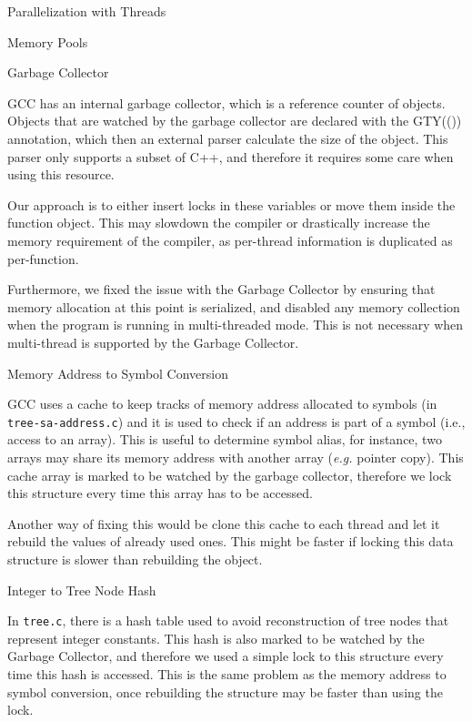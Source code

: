 \begin{section}{Parallelization with Threads}
\begin{subsection}{Memory Pools}
\end{subsection}

\begin{subsection}{Garbage Collector}

GCC has an internal garbage collector, which is a reference counter of objects.
Objects that are watched by the garbage collector are declared with the GTY(())
annotation, which then an external parser calculate the size of the object.
This parser only supports a subset of C++, and therefore it requires some care
when using this resource.

Our approach is to either insert locks in
these variables or move them inside the function object. This may slowdown 
the compiler or drastically increase the memory requirement of the compiler,
as per-thread information is duplicated as per-function.

Furthermore, we fixed the issue with the Garbage Collector by ensuring that
memory allocation at this point is serialized, and disabled any memory
collection when the program is running in multi-threaded mode. This is not
necessary when multi-thread is supported by the Garbage Collector.

\end{subsection}

\begin{subsection}{Memory Address to Symbol Conversion}

GCC uses a cache to keep tracks of memory address allocated to symbols (in
\texttt{tree-sa-address.c}) and it is used to check if an address is part of a symbol
(i.e., access to an array). This is useful to determine symbol alias, for instance,
two arrays may share its memory address with another array (\textit{e.g.} pointer
copy).
This cache array is marked to be watched by the
garbage collector, therefore we lock this structure every time this array has
to be accessed. 

Another way of fixing this would be clone this cache to each thread and
let it rebuild the values of already used ones. This might be faster if
locking this data structure is slower than rebuilding the object.

\end{subsection}

\begin{subsection}{Integer to Tree Node Hash}

In \texttt{tree.c}, there is a hash table used to avoid reconstruction of tree nodes
that represent integer constants. This hash is also marked to be watched by the
Garbage Collector, and therefore we used a simple lock to this structure every
time this hash is accessed. This is the same problem as the memory address to
symbol conversion, once rebuilding the structure may be faster than using the
lock.


\end{subsection}
\end{section}

